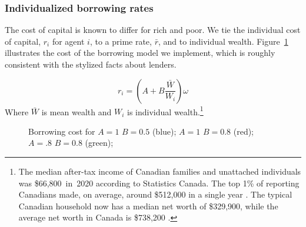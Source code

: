 \subsubsection{Individualized borrowing rates} \label{section-borowing-rate}

 The cost of capital is known to differ for rich and poor. We tie the individual cost of capital,  $r_i$ for agent $i$, to a prime rate, $\bar r$, and to individual wealth. Figure~\ref{fig-capital-cost} illustrates the cost of the borrowing model we implement, which is  roughly consistent  with the stylized facts about lenders. 
 

 \[ r_i = (A + B \frac{\bar{W}}{W_i})\omega\]
Where $\bar{W}$ is mean wealth and $W_i$ is individual wealth.\footnote{The median after-tax income of Canadian families and unattached individuals was \$66,800 in 2020 according to Statistics Canada.%
 The top 1\% of reporting Canadians made, on average, around \$512,000 in a single year \cite{WEB_model-stats-can-canadian-incomes}. %
 The typical Canadian household now has a median net worth of \$329,900, while the average net worth in Canada is \$738,200 \cite{WEB-model-stats-can-median-net-worth}.  %
} 

\begin{figure}[!hb]
\begin{center}
\caption{Borrowing cost for  $A=1$  $B=0.5$ (blue);  $A=1$  $B=0.8$ (red);  $A=.8$  $B=0.8$ (green);}
\label{fig-capital-cost}
\end{center}
\end{figure}



